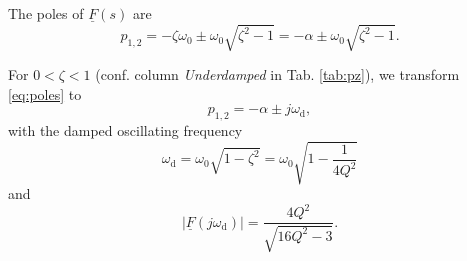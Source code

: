 \documentclass{article}[11pt]
\begin{document}
\medskip

The poles of $\underline{F}(s)$ are
\begin{equation}\label{eq:poles}
p_{1,2} = - \zeta \omega_0 \pm \omega_0 \sqrt{\zeta^2-1} = - \alpha \pm \omega_0 \sqrt{\zeta^2-1}.
\end{equation}

\medskip

For $0<\zeta < 1$ (conf. column \textit{Underdamped} in Tab. \ref{tab:pz}), 
we transform \eqref{eq:poles} to
\begin{equation}\label{eq:poles-underdamped}
p_{1,2} = - \alpha \pm j \omega_{\mathrm{d}},
\end{equation}
with the damped oscillating frequency 
\begin{equation}\label{eq:poles}
\omega_{\mathrm{d}} = \omega_0 \sqrt{1-\zeta^2} = \omega_0 \sqrt{1-\frac{1}{4 Q^2}}
\end{equation}
and
\begin{equation}
\left|\underline{F}(j\omega_{\mathrm{d}})\right| = \frac{4 Q^2}{\sqrt{16 Q^2 -3}}.
\end{equation}
\end{document}
